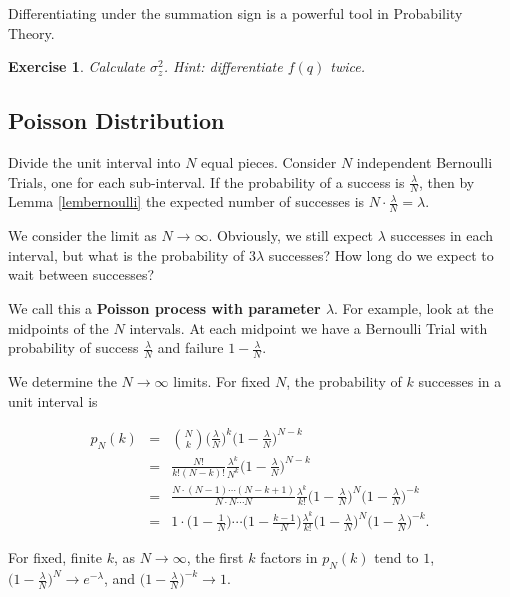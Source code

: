 \documentclass[12pt,letterpaper]{report}
\newcommand\bea{\begin{eqnarray}}
\newcommand\eea{\end{eqnarray}}
\newtheorem{exe}[thm]{Exercise}
\begin{document}
Differentiating under the summation sign is a powerful tool in
Probability Theory.

\begin{exe} Calculate $\sigma^2_z$. Hint: differentiate $f(q)$ twice.
\end{exe}

\subsection{Poisson Distribution}

Divide the unit interval into $N$ equal pieces. Consider $N$
independent Bernoulli Trials, one for each sub-interval. If the
probability of a success is $\frac{\lambda}{N}$, then by Lemma
\ref{lembernoulli} the expected number of successes is $N \cdot
\frac{\lambda}{N} = \lambda$.

We consider the limit as $N \rightarrow \infty$. Obviously, we
still expect $\lambda$ successes in each interval, but what is the
probability of $3\lambda$ successes? How long do we expect to wait
between successes?

We call this a \textbf{Poisson process with parameter $\lambda$}.
For example, look at the midpoints of the $N$ intervals. At each
midpoint we have a Bernoulli Trial with probability of success
$\frac{\lambda}{N}$ and failure $1 - \frac{\lambda}{N}$.

We determine the $N \rightarrow \infty$ limits. For fixed $N$, the
probability of $k$ successes in a unit interval is

\bea p_N(k) &=& {N \choose k} \Big( \frac{\lambda}{N} \Big)^k
\Big( 1 - \frac{\lambda}{N} \Big)^{N-k} \nonumber\\ &=&
\frac{N!}{k!(N-k)!} \frac{\lambda^k}{N^k} \Big(1 -
\frac{\lambda}{N} \Big)^{N-k} \nonumber\\ &=& \frac{N \cdot (N-1)
\cdots (N-k+1)}{N \cdot N \cdots N} \frac{\lambda^k}{k!} \Big(1 -
\frac{\lambda}{N} \Big)^N \Big(1 - \frac{\lambda}{N} \Big)^{-k}
\nonumber\\ &=& 1 \cdot \Big(1 - \frac{1}{N}\Big) \cdots \Big(1 -
\frac{k-1}{N}\Big) \frac{\lambda^k}{k!} \Big(1 - \frac{\lambda}{N}
\Big)^N \Big(1 - \frac{\lambda}{N} \Big)^{-k}. \eea



For fixed, finite $k$, as $N \rightarrow \infty$, the first $k$
factors in $p_N(k)$ tend to $1$, $\Big(1 - \frac{\lambda}{N}
\Big)^N \rightarrow e^{-\lambda}$, and $\Big(1 - \frac{\lambda}{N}
\Big)^{-k} \rightarrow 1$.
\end{document}
